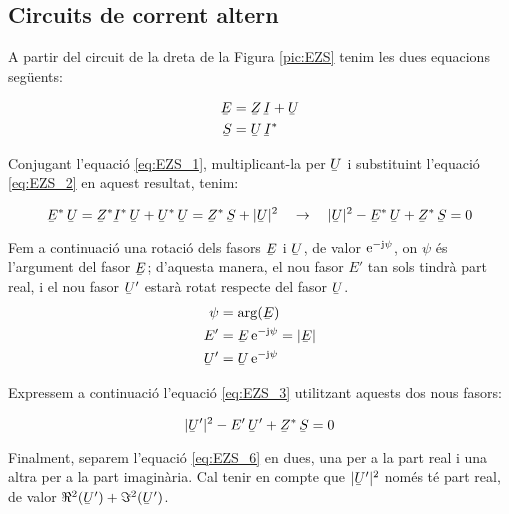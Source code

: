 \subsection{Circuits de corrent altern}

A partir del circuit de la dreta de la Figura \vref{pic:EZS} tenim les dues equacions seg\"{u}ents:

\begin{align}
   \cmplx{E} &= \cmplx{Z} \, \cmplx{I} + \cmplx{U} \label{eq:EZS_1} \\
   \cmplx{S} &= \cmplx{U} \, \cmplx{I}^*           \label{eq:EZS_2}
\end{align}

Conjugant l'equaci\'{o} \eqref{eq:EZS_1}, multiplicant-la per $\cmplx{U}$ i substituint l'equaci\'{o} \eqref{eq:EZS_2} en aquest resultat, tenim:

\begin{equation}
   \cmplx{E}^* \, \cmplx{U} = \cmplx{Z}^* \cmplx{I}^* \, \cmplx{U} + \cmplx{U}^* \, \cmplx{U} =
   \cmplx{Z}^* \, \cmplx{S} + |\cmplx{U}|^2 \quad \rightarrow \quad
   |\cmplx{U}|^2 - \cmplx{E}^* \, \cmplx{U} + \cmplx{Z}^* \, \cmplx{S} = 0
   \label{eq:EZS_3}
\end{equation}

Fem a continuaci\'{o} una rotaci\'{o} dels fasors $\cmplx{E}$ i
$\cmplx{U}$, de valor $\mathrm{e}^{-\mathrm{j}\psi}$, on $\psi$ \'{e}s l'argument
del fasor $\cmplx{E}$; d'aquesta manera, el nou fasor $E'$ tan
sols tindr\`{a} part real, i el nou fasor $\cmplx{U}'$ estar\`{a} rotat
respecte del fasor $\cmplx{U}$.
\begin{align}
   \psi &= \arg(\cmplx{E}) \label{eq:EZS_9} \\
   E' &= \cmplx{E} \, \eu^{-\ju\psi} = |\cmplx{E}|  \label{eq:EZS_4} \\
   \cmplx{U}' &= \cmplx{U} \, \eu^{-\ju\psi}   \label{eq:EZS_5}
\end{align}

Expressem a continuaci\'{o} l'equaci\'{o} \eqref{eq:EZS_3} utilitzant
aquests dos nous fasors:

\begin{equation}
   |\cmplx{U}'|^2 - E' \, \cmplx{U}' + \cmplx{Z}^* \, \cmplx{S} = 0 \label{eq:EZS_6}
\end{equation}

Finalment, separem l'equaci\'{o} \eqref{eq:EZS_6} en dues, una per a la part real i una altra per a la part imagin\`{a}ria. Cal tenir en compte que $|\cmplx{U}'|^2$ nom\'{e}s t\'{e} part real, de valor $\Re^2(\cmplx{U}') + \Im^2(\cmplx{U}')$.


